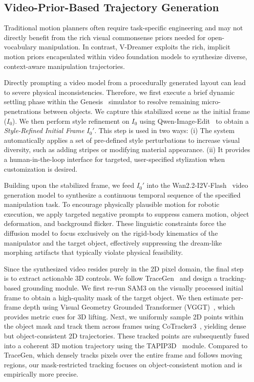 \subsection{Video-Prior-Based Trajectory Generation}
\label{sec:traj_gen}

Traditional motion planners often require task-specific engineering and may not directly benefit from the rich visual commonsense priors needed for open-vocabulary manipulation. In contrast, V-Dreamer exploits the rich, implicit motion priors encapsulated within video foundation models to synthesize diverse, context-aware manipulation trajectories.

Directly prompting a video model from a procedurally generated layout can lead to severe physical inconsistencies. Therefore, we first execute a brief dynamic settling phase within the Genesis~\cite{Genesis} simulator to resolve remaining micro-penetrations between objects. We capture this stabilized scene as the initial frame ($I_0$). We then perform style refinement on $I_0$ using Qwen-Image-Edit~\cite{wu2025qwenimagetechnicalreport} to obtain a \textit{Style-Refined Initial Frame} $I_0'$. This step is used in two ways: (i) The system automatically applies a set of pre-defined style perturbations to increase visual diversity, such as adding stripes or modifying material appearance. (ii) It provides a human-in-the-loop interface for targeted, user-specified stylization when customization is desired.

Building upon the stabilized frame, we feed $I_0'$ into the Wan2.2-I2V-Flash~\cite{wan2025} video generation model to synthesize a continuous temporal sequence of the specified manipulation task. To encourage physically plausible motion for robotic execution, we apply targeted negative prompts to suppress camera motion, object deformation, and background flicker. These linguistic constraints force the diffusion model to focus exclusively on the rigid-body kinematics of the manipulator and the target object, effectively suppressing the dream-like morphing artifacts that typically violate physical feasibility.

Since the synthesized video resides purely in the 2D pixel domain, the final step is to extract actionable 3D controls. We follow TraceGen~\cite{lee2026tracegen} and design a tracking-based grounding module. We first re-run SAM3 on the visually processed initial frame to obtain a high-quality mask of the target object. We then estimate per-frame depth using Visual Geometry Grounded Transformer (VGGT)~\cite{wang2025vggt}, which provides metric cues for 3D lifting. Next, we uniformly sample 2D points within the object mask and track them across frames using CoTracker3~\cite{karaev2023cotracker}, yielding dense but object-consistent 2D trajectories. These tracked points are subsequently fused into a coherent 3D motion trajectory using the TAPIP3D~\cite{tapip3d} module. Compared to TraceGen, which densely tracks pixels over the entire frame and follows moving regions, our mask-restricted tracking focuses on object-consistent motion and is empirically more precise. 

